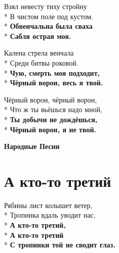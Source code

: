 \medskip

\begin{minipage}{\linewidth}
Взял невесту тиху стройну\\*
В чистом поле под кустом.\\*
\textbf{Обвенчальна была сваха}\\*
\textbf{Сабля острая моя.}\\
\end{minipage}\par\medskip\nobreak

\medskip

\begin{minipage}{\linewidth}
Калена стрела венчала\\*
Среди битвы роковой.\\*
\textbf{Чую, смерть моя подходит,}\\*
\textbf{Чёрный ворон, весь я твой.}\\
\end{minipage}\par\medskip\nobreak

\medskip

\begin{minipage}{\linewidth}
Чёрный ворон, чёрный ворон,\\*
Что ж ты вьёшься надо мной,\\*
\textbf{Ты добычи не дождёшься,}\\*
\textbf{Чёрный ворон, я не твой.}\\
\end{minipage}

\vspace{\fill}\newpage

\cleardoublepage
\thispagestyle{empty}
\vspace*{\fill}
{\centering\huge\bfseries Народные Песни\par}
\vspace*{\fill}
\newpage
\section{А кто-то третий}
\label{song:А_кто-то_третий}

\medskip

\begin{minipage}{\linewidth}
Рябины лист колышет ветер,\\*
Тропинка вдаль уводит нас,\\*
\textbf{А кто-то третий,}\\*
\textbf{А кто-то третий}\\*
\textbf{С тропинки той не сводит глаз.}\\
\end{minipage}\par\medskip\nobreak

